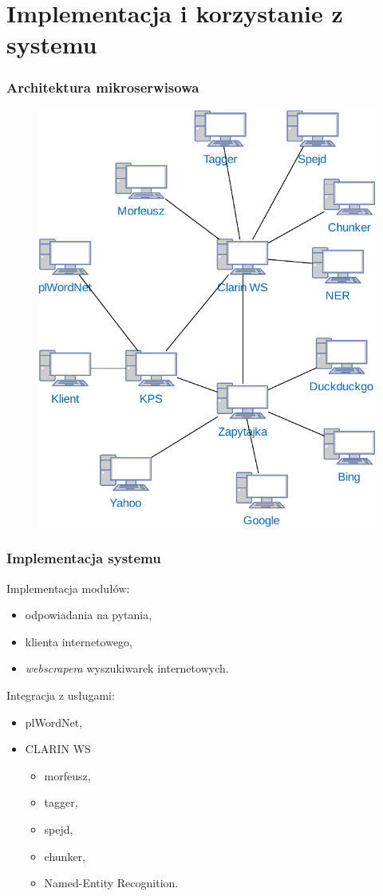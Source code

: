 \documentclass{beamer}
\begin{document}
\section{Implementacja i korzystanie z systemu}
\begin{frame}
  \frametitle{Architektura mikroserwisowa}
  \begin{figure}
    \centering
    \includegraphics[width=0.5\columnwidth]{figures/WEDT-Uslugi.pdf}
    \label{fig:klient}
  \end{figure}
\end{frame}

\begin{frame}
  \frametitle{Implementacja systemu}
  \begin{block}{Implementacja modułów:}
    \begin{itemize}
      \item odpowiadania na pytania,
      \item klienta internetowego,
      \item \textit{webscrapera} wyszukiwarek internetowych.
    \end{itemize}
  \end{block}

  \begin{block}{Integracja z usługami:}
    \begin{itemize}
      \item plWordNet,
      \item CLARIN WS
      \begin{itemize}
        \item morfeusz,
        \item tagger,
        \item spejd,
        \item chunker,
        \item Named-Entity Recognition.
      \end{itemize}
    \end{itemize}
  \end{block}
\end{frame}
\end{document}
